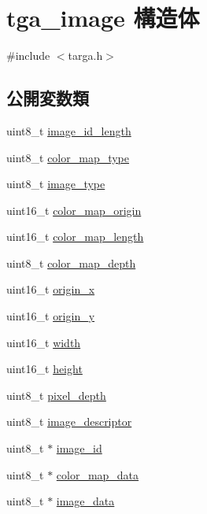 \hypertarget{structtga__image}{}\section{tga\+\_\+image 構造体}
\label{structtga__image}


{\ttfamily \#include $<$targa.\+h$>$}

\subsection*{公開変数類}
\begin{DoxyCompactItemize}
\item 
uint8\+\_\+t \hyperlink{structtga__image_a5cab1a698dcd5e4866997f1774bb3cc4}{image\+\_\+id\+\_\+length}
\item 
uint8\+\_\+t \hyperlink{structtga__image_a45fbfcb14489f00099b35409e34f6cf2}{color\+\_\+map\+\_\+type}
\item 
uint8\+\_\+t \hyperlink{structtga__image_adf9f4b49da5ce03d7364c83b42480fe3}{image\+\_\+type}
\item 
uint16\+\_\+t \hyperlink{structtga__image_acf251fb02f6128c4808b24fddb331a7d}{color\+\_\+map\+\_\+origin}
\item 
uint16\+\_\+t \hyperlink{structtga__image_a200c9ac934e22d6777ae3bf947cef19d}{color\+\_\+map\+\_\+length}
\item 
uint8\+\_\+t \hyperlink{structtga__image_aa13eef4443b1ea39389a0cf9c9bb9805}{color\+\_\+map\+\_\+depth}
\item 
uint16\+\_\+t \hyperlink{structtga__image_ace037ad971b4b52da269891621b805db}{origin\+\_\+x}
\item 
uint16\+\_\+t \hyperlink{structtga__image_a11c258cbfc20d8087ffe4e6b8ef4d40f}{origin\+\_\+y}
\item 
uint16\+\_\+t \hyperlink{structtga__image_acf9bd19c10794f18f60a001faef58111}{width}
\item 
uint16\+\_\+t \hyperlink{structtga__image_a4dc0ebbfcac989925ee7644ca3e28eab}{height}
\item 
uint8\+\_\+t \hyperlink{structtga__image_ae3e4a7107ebf7f4149f3522a0e7526e5}{pixel\+\_\+depth}
\item 
uint8\+\_\+t \hyperlink{structtga__image_ac99db40eff2f958594a5484185bdd59e}{image\+\_\+descriptor}
\item 
uint8\+\_\+t $\ast$ \hyperlink{structtga__image_a16f8b6f04c767463f88701cced228d3d}{image\+\_\+id}
\item 
uint8\+\_\+t $\ast$ \hyperlink{structtga__image_ae0c92f5d861e12f9ba3cbbe1e730f13d}{color\+\_\+map\+\_\+data}
\item 
uint8\+\_\+t $\ast$ \hyperlink{structtga__image_a4d1ce9142f635f07d106d35364af89f0}{image\+\_\+data}
\end{DoxyCompactItemize}



